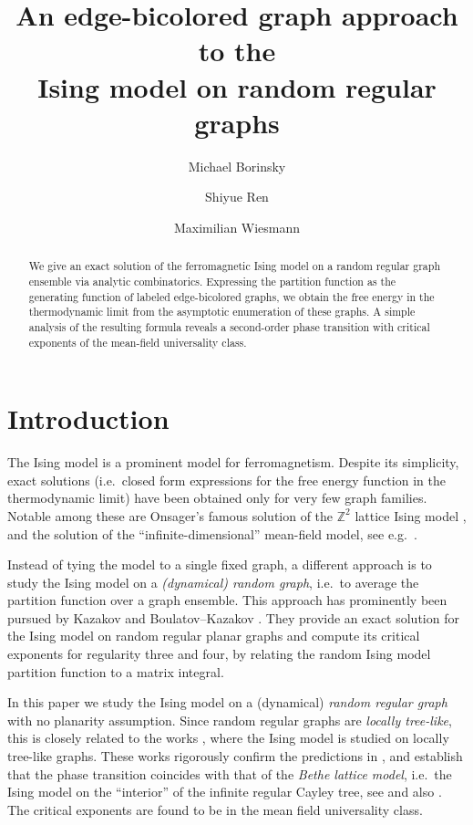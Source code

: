 \documentclass{article}
\title{\bf An edge-bicolored graph approach to the\\Ising model on random regular graphs}
\date{}
\author{Michael Borinsky \and Shiyue Ren \and Maximilian Wiesmann}
\numberwithin{theorem}{section}
\theoremstyle{remark}
\newcommand{\ZZ}{\mathbb{Z}}
\begin{document}
\maketitle

\begin{abstract}
We give an exact solution of the ferromagnetic Ising model on a random regular graph ensemble via analytic combinatorics. Expressing the partition function as the generating function of labeled edge-bicolored graphs, we obtain the free energy in the thermodynamic limit from the asymptotic enumeration of these graphs. A simple analysis of the resulting formula reveals a second-order phase transition with critical exponents of the mean-field universality class.
\end{abstract}


\section{Introduction}
\label{sec:intro}

The Ising model \cite{lenz1920Ising} is a prominent model for ferromagnetism. Despite its simplicity, exact solutions (i.e.\ closed form expressions for the free energy function in the thermodynamic limit) have been obtained only for very few graph  families. Notable among these are Onsager's famous solution of the $\ZZ^2$ lattice Ising model \cite{OnsagerSolution}, and the solution of the ``infinite-dimensional'' mean-field model, see e.g.\ \cite[\S 3]{baxter1982exactly}.\par

Instead of tying the model to a single fixed graph, a different approach is to study the Ising model on a \emph{(dynamical) random graph}, i.e.\ 
to average the partition function over a graph ensemble. This approach has prominently been pursued by Kazakov \cite{KAZAKOV_Ising} and Boulatov--Kazakov \cite{BOULATOV_Kazakov_Ising}. They provide an exact solution for the Ising model on random regular planar graphs and compute its critical exponents for regularity three and four, by relating the random Ising model partition function to a matrix integral.\par

In this paper we study the Ising model on a (dynamical) \emph{random regular graph} with no planarity assumption. Since random regular graphs are \emph{locally tree-like}, this is closely related to the works \cite{Dembo_Montanari_Locally_Tree_Like,dembo2013factor,dommers2014ising}, where the Ising model is studied on locally tree-like graphs. 
These works rigorously confirm the predictions in \cite{Dorogovtsev:2002ix,leone2002ferromagnetic}, and establish that the phase transition coincides with that of the \emph{Bethe lattice model}, i.e.\ the Ising model on the ``interior'' of the infinite regular Cayley tree, see \cite{Chen1974Hopping} and also \cite[\S 4]{baxter1982exactly}. The critical exponents are found to be in the mean field universality class.\par
\end{document}
